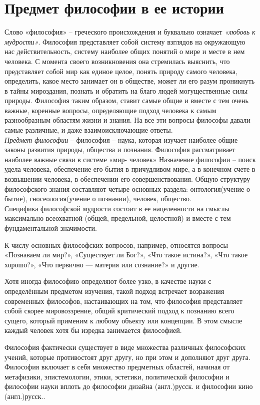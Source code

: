 \documentclass[12pt]{article}
\begin{document}
\tableofcontents


\newpage
\section{Предмет философии в ее истории}
Слово «философия» – греческого происхождения и буквально означает \textit{«любовь к мудрости»}.
Философия представляет собой систему взглядов на окружающую нас действительность, систему наиболее общих понятий
о мире и месте в нем человека. С момента своего возникновения она стремилась выяснить, что представляет
собой мир как единое целое, понять природу самого человека, определить, какое место занимает он в обществе,
может ли его разум проникнуть в тайны мироздания, познать и обратить на благо людей могущественные силы
природы. Философия таким образом, ставит самые общие и вместе с тем очень важные, коренные вопросы,
определяющие подход человека к самым разнообразным областям жизни и знания. На все эти вопросы
философы давали самые различные, и даже взаимоисключающие ответы. \\
\textit{Предмет философии} – философия – наука, которая изучает наиболее общие законы развития природы, общества
и познания. Философия рассматривает наиболее важные связи в системе «мир- человек»
Назначение философии – поиск удела человека, обеспечение его бытия в причудливом мире, а в конечном счете
в возвышении человека, в обеспечении его совершенствования. Общую структуру философского знания
составляют четыре основных раздела: онтология(учение о бытие), гносеология(учение о познании), человек,
общество.\\
Специфика философской мудрости состоит в ее нацеленности на смыслы максимально всеохватной (общей,
предельной, целостной) и вместе с тем фундаментальной значимости.

К числу основных философских вопросов, например, относятся вопросы «Познаваем ли мир?», «Существует ли Бог?»,
«Что такое истина?», «Что такое хорошо?», «Что первично — материя или сознание?» и другие.

Хотя иногда философию определяют более узко, в качестве науки с определённым предметом изучения,
такой подход встречает возражения современных философов, настаивающих на том, что философия представляет собой скорее 
мировоззрение, общий критический подход к познанию всего сущего, который применим к любому объекту или концепции.
В этом смысле каждый человек хотя бы изредка занимается философией.

Философия фактически существует в виде множества различных философских учений, которые противостоят друг другу,
но при этом и дополняют друг друга.
Философия включает в себя множество предметных областей, начиная от метафизики, эпистемологии, этики, эстетики,
политической философии и философии науки вплоть до философии дизайна (англ.)русск. и философии кино (англ.)русск..
\end{document}

